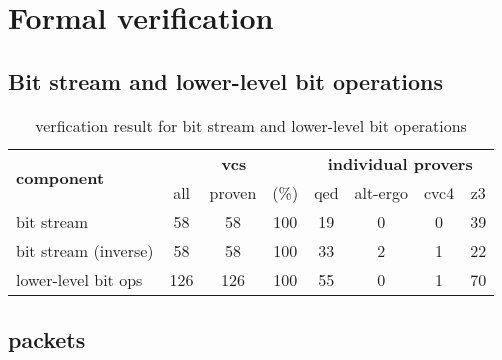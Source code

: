 
\chapter{Formal verification}
\label{cha:formal-verification}

\section{Bit stream and lower-level bit operations}
\label{sec:bitstream-verification}

\begin{table}[hbt]
\begin{center}
    \begin{tabular}{|l|ccc|cccc|}
\hline
\multirow{2}{*}{\textbf{component}} &
\multicolumn{3}{c|}{ \textbf{vcs}} &
\multicolumn{4}{c|}{\textbf{individual provers}}\\
\cline{2-8}
               &  all & proven & (\%) & qed & alt-ergo & cvc4 & z3  \\
\hline
\hline
bit stream     & 58 &  58 & 100 & 19 &  0 & 0 & 39  \\
\hline
bit stream (inverse)  & 58 & 58 & 100 & 33 &  2 & 1 & 22  \\
\hline
lower-level bit ops & 126 & 126 & 100 & 55 &  0 & 1 & 70  \\
\hline
\end{tabular}
\end{center}
\caption{\label{tbl:bitstream-verification} verfication result for bit stream and lower-level bit operations}
\end{table}

\FloatBarrier  %

\section{packets}


